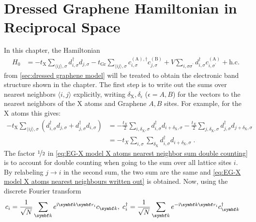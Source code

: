 \documentclass[../notes.tex]{subfiles}
\begin{document}
\raggedbottom

\chapter{Dressed Graphene Hamiltonian in Reciprocal Space}\label{ch:dressed graphene reciprocal space}

In this chapter, the Hamiltonian
\begin{align}
	H_0 &= -t_{\mathrm{X}} \sum_{\langle ij \rangle, \sigma} d_{i, \sigma}^{\dagger} d_{j, \sigma}
	-t_{\mathrm{Gr}} \sum_{\langle ij \rangle, \sigma}
	c_{i, \sigma}^{(\mathrm{A}), \dagger} c_{j, \sigma}^{(\mathrm{B})}
	+ V \sum_{i, \sigma \sigma^{\prime}}
	d_{i, \sigma}^{\dagger} c_{i, \sigma^{\prime}}^{(\mathrm{A})} + \mathrm{h.c.}
	\label{eq:EG-X model Hamiltonian non-interacting appendix}
\end{align}
from \cref{sec:dressed graphene model} will be treated to obtain the electronic band structure shown in the chapter.
The first step is to write out the sums over nearest neighbors \(\langle i, j \rangle\) explicitly, writing \(\delta_{\mathrm{X}}, \delta_{\epsilon}\) (\(\epsilon = A, B\)) for the vectors to the nearest neighbors of the \(\mathrm{X}\) atoms and Graphene \(A, B\) sites.
For example, for the \(\mathrm{X}\) atoms this gives:
\begin{align}
	-t_{\mathrm{X}} \sum_{\langle ij \rangle, \sigma} (d_{i, \sigma}^{\dagger} d_{j, \sigma} + d_{j, \sigma}^{\dagger} d_{i, \sigma})
	&= -\frac{t_X}{2} \sum_{i,\delta_{\mathrm{X}},\sigma} d_{i, \sigma}^{\dagger} d_{i + \delta_{\mathrm{X}}, \sigma}
	-\frac{t_X}{2} \sum_{j,\delta_{\mathrm{X}},\sigma} d_{j, \sigma}^{\dagger} d_{j + \delta_{\mathrm{X}}, \sigma} \label{eq:EG-X model X atoms nearest neighbor sum double counting} \\
	&= -t_X \sum_{i,\sigma} \sum_{\delta_{\mathrm{X}}} d_{i, \sigma}^{\dagger} d_{i + \delta_{\mathrm{X}}, \sigma} \;. \label{eq:EG-X model X atoms nearest neighbours written out}
\end{align}
The factor \(\nicefrac{1}{2}\) in \cref{eq:EG-X model X atoms nearest neighbor sum double counting} is to account for double counting when going to the sum over all lattice sites \(i\).
By relabeling \(j \to i\) in the second sum, the two sum are the same and \cref{eq:EG-X model X atoms nearest neighbours written out} is obtained.
Now, using the discrete Fourier transform
\begin{align}
	c_{i} &= \frac{1}{\sqrt{N}} \sum_{\vb{k}} e^{\iu \vb{k} \vb{r}_{i}} c_{\vb{k}} ,\;
	c_{i}^{\dagger} = \frac{1}{\sqrt{N}} \sum_{\vb{k}} e^{-\iu \vb{k} \vb{r}_{i}} c_{\vb{k}}^{\dagger}
\end{align}
\end{document}
